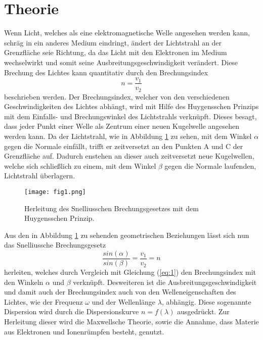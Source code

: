 \section{Theorie}
\label{sec:Theorie}
Wenn Licht, welches als eine elektromagnetische Welle angesehen werden kann, schräg in ein anderes Medium eindringt, ändert der Lichtstrahl an der Grenzfläche
seie Richtung, da das Licht mit den Elektronen im Medium wechselwirkt und somit seine Ausbreitungsgeschwindigkeit verändert. Diese Brechung des Lichtes kann
quantitativ durch den Brechungsindex
\begin{equation}
n=\frac{v_1}{v_2}
\label{eq:1}
\end{equation}
beschrieben werden. Der Brechungsindex, welcher von den verschiedenen Geschwindigkeiten des Lichtes abhängt, wird mit Hilfe des Huygensschen Prinzips mit dem
Einfalls- und Brechungswinkel des Lichtstrahls verknüpft. Dieses besagt, dass jeder Punkt einer Welle als Zentrum einer neuen Kugelwelle angesehen werden kann.
Da der Lichtstrahl, wie in Abbildung \ref{fig:1} zu sehen, mit dem Winkel $\alpha$ gegen die Normale einfällt, trifft er zeitversetzt an den Punkten A und C
der Grenzfläche auf. Dadurch enstehen an dieser auch zeitversetzt neue Kugelwellen, welche sich schließlich zu einem, mit dem Winkel $\beta$ gegen die Normale
laufenden, Lichtstrahl überlagern.
\begin{figure}
  \centering
  \texttt{[image: fig1.png]}
  \caption{Herleitung des Snelliusschen Brechungsgesetzes mit dem Huygensschen Prinzip. \cite{1}}
  \label{fig:1}
\end{figure}
Aus den in Abbildung \ref{fig:1} zu sehenden geometrischen Beziehungen lässt sich nun das Snelliussche Brechungsgesetz
\begin{equation}
\frac{sin(\alpha)}{sin(\beta)} = \frac{v_1}{v_2} = n
\end{equation}
herleiten, welches durch Vergleich mit Gleichung (\ref{eq:1}) den Brechungsindex mit den Winkeln $\alpha$ und $\beta$ verknüpft.
Desweiteren ist die Ausbreitungsgeschwindigkeit und damit auch der Brechungsindex auch von den Welleneigenschaften  des Lichtes, wie der Frequenz $\omega$ und der
Wellenlänge $\lambda$, abhängig.
Diese sogenannte Dispersion wird durch die Dispersionskurve $n=f(\lambda)$ ausgedrückt.
Zur Herleitung dieser wird die Maxwellsche Theorie, sowie die Annahme, dass Materie aus Elektronen und Ionenrümpfen besteht, genutzt.
